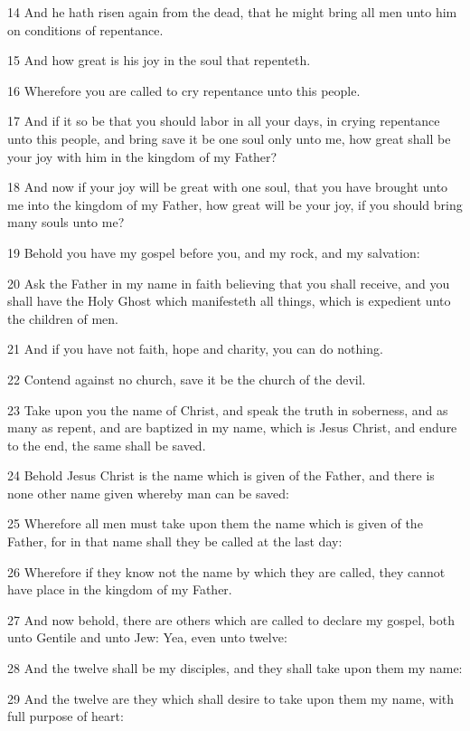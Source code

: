 				14 And he hath risen again from the dead, that he might bring all men unto him on conditions of repentance.

				15 And how great is his joy in the soul that repenteth.

				16 Wherefore you are called to cry repentance unto this people.

				17 And if it so be that you should labor in all your days, in crying repentance unto this people, and bring save it be one soul only unto me, how great shall be your joy with him in the kingdom of my Father?

				18 And now if your joy will be great with one soul, that you have brought unto me into the kingdom of my Father, how great will be your joy, if you should bring many souls unto me?

				19 Behold you have my gospel before you, and my rock, and my salvation:

				20 Ask the Father in my name in faith believing that you shall receive, and you shall have the Holy Ghost which manifesteth all things, which is expedient unto the children of men.

				21 And if you have not faith, hope and charity, you can do nothing.

				22 Contend against no church, save it be the church of the devil.

				23 Take upon you the name of Christ, and speak the truth in soberness, and as many as repent, and are baptized in my name, which is Jesus Christ, and endure to the end, the same shall be saved.

				24 Behold Jesus Christ is the name which is given of the Father, and there is none other name given whereby man can be saved:

				25 Wherefore all men must take upon them the name which is given of the Father, for in that name shall they be called at the last day:

				26 Wherefore if they know not the name by which they are called, they cannot have place in the kingdom of my Father.

				27 And now behold, there are others which are called to declare my gospel, both unto Gentile and unto Jew: Yea, even unto twelve:

				28 And the twelve shall be my disciples, and they shall take upon them my name:

				29 And the twelve are they which shall desire to take upon them my name, with full purpose of heart:


